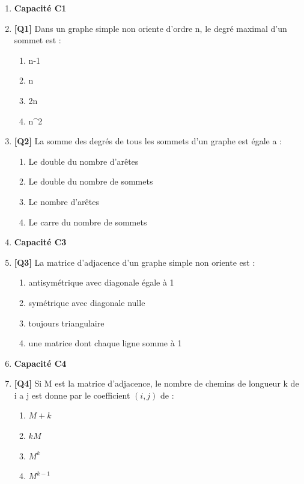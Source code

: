 \begin{enumerate}

\item[] \textbf{Capacité C1}

\item \textbf{[Q1]} Dans un graphe simple non oriente d'ordre n, le degré maximal d'un sommet est :
  \begin{enumerate}[label=\Alph*.]
    \item n-1
    \item n
    \item 2n
    \item n\textasciicircum{}2
  \end{enumerate}

\item \textbf{[Q2]} La somme des degrés de tous les sommets d'un graphe est égale a :
  \begin{enumerate}[label=\Alph*.]
    \item Le double du nombre d'arêtes
    \item Le double du nombre de sommets
    \item Le nombre d'arêtes
    \item Le carre du nombre de sommets
  \end{enumerate}

\item[] \textbf{Capacité C3}

\item \textbf{[Q3]} La matrice d'adjacence d'un graphe simple non oriente est :
  \begin{enumerate}[label=\Alph*.]
    \item antisymétrique avec diagonale égale à 1
    \item symétrique avec diagonale nulle
    \item toujours triangulaire
    \item une matrice dont chaque ligne somme à 1
  \end{enumerate}

\item[] \textbf{Capacité C4}

\item \textbf{[Q4]} Si M est la matrice d'adjacence, le nombre de chemins de longueur k de i a j est donne par le coefficient $(i,j)$ de :
  \begin{enumerate}[label=\Alph*.]
    \item $M + k$
    \item $k M$
    \item $M^k$
    \item $M^{k-1}$
  \end{enumerate}


\end{enumerate}
